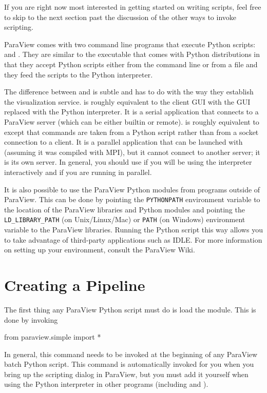 If you are right now most interested in getting started on writing scripts,
feel free to skip to the next section past the discussion of the other ways
to invoke scripting.

ParaView comes with two command line programs that execute Python scripts:
 and .  They are similar to the
 executable that comes with Python distributions in
that they accept Python scripts either from the command line or from a file
and they feed the scripts to the Python interpreter.

The difference between  and  is
subtle and has to do with the way they establish the visualization
service.   is roughly equivalent to the
 client GUI with the GUI replaced with the Python
interpreter.  It is a serial application that connects to a ParaView server
(which can be either builtin or remote).   is roughly
equivalent to  except that commands are taken from a
Python script rather than from a socket connection to a client.  It is a
parallel application that can be launched with  (assuming
it was compiled with MPI), but it cannot connect to another server; it is
its own server.  In general, you should use  if you
will be using the interpreter interactively and  if
you are running in parallel.

It is also possible to use the ParaView Python modules from programs
outside of ParaView.  This can be done by pointing the \texttt{PYTHONPATH}
environment variable to the location of the ParaView libraries and Python
modules and pointing the \texttt{LD\_LIBRARY\_PATH} (on Unix/Linux/Mac) or
\texttt{PATH} (on Windows) environment variable to the ParaView libraries.
Running the Python script this way allows you to take advantage of
third-party applications such as IDLE.  For more information on setting up
your environment, consult the ParaView Wiki.

\section{Creating a Pipeline}
\label{sec:CreatingAPipeline}

The first thing any ParaView Python script must do is load the
 module.  This is done by invoking
\begin{python}
from paraview.simple import *
\end{python}
In general, this command needs to be invoked at the beginning of any
ParaView batch Python script.  This command is automatically invoked for
you when you bring up the scripting dialog in ParaView, but you must add it
yourself when using the Python interpreter in other programs (including
 and ).

